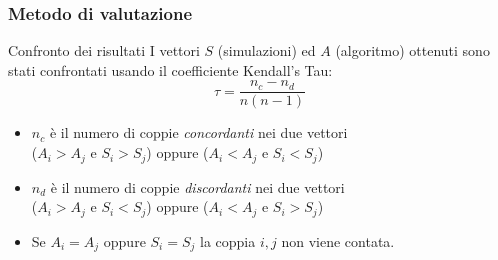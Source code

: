 \begin{frame}
    \frametitle{Metodo di valutazione}
    \begin{block}{Confronto dei risultati}
        I vettori $S$ (simulazioni) ed $A$ (algoritmo) ottenuti sono stati confrontati usando il coefficiente \alert{Kendall's Tau}: 
        \begin{equation*}
            \tau = \frac{n_c - n_d}{n(n-1)}
        \end{equation*}

        \begin{itemize}
            \item $n_c$ è il numero di coppie \emph{concordanti} nei due vettori \\
                \quad ($A_i > A_j$ e $S_i > S_j$) oppure ($A_i < A_j$ e $S_i < S_j$)
            \item $n_d$ è il numero di coppie \emph{discordanti} nei due vettori \\
                \quad ($A_i > A_j$ e $S_i < S_j$) oppure ($A_i < A_j$ e $S_i > S_j$) 
            \item Se $A_i = A_j$ oppure $S_i = S_j$ la coppia $i, j$ non viene contata.
        \end{itemize}
        
        
        
    \end{block}
\end{frame}